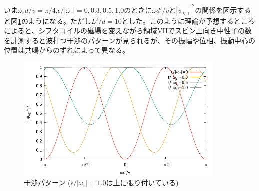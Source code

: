 いま$\omega_rd/v=\pi/4$,$\epsilon/|\omega_z|=0,0.3,0.5,1.0$のときに$\omega d'/v$と$|\psi_\mathrm{VII}|^2$の関係を図示すると図\ref{Nonreso_fig_interference}のようになる。ただし$L'/d=10$とした。このように理論が予想するところによると、シフタコイルの磁場を変えながら領域VIIでスピン上向き中性子の数を計測すると波打つ干渉のパターンが見られるが、その振幅や位相、振動中心の位置は共鳴からのずれによって異なる。

\begin{figure}[h]
\centering
\includegraphics[width=10cm]{nonreso/nonreso_interference.pdf}
\caption{干渉パターン {\footnotesize ($\epsilon/|\omega_z|=1.0$は上に張り付いている)}}
\label{Nonreso_fig_interference}
\vspace{-1cm}
\end{figure}



\renewcommand{\arraystretch}{1}


